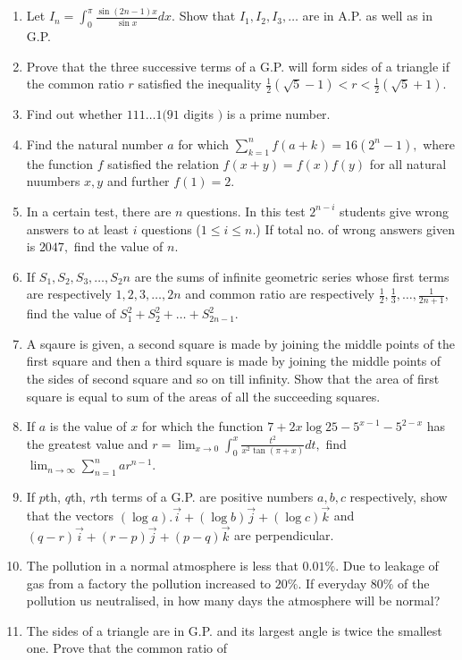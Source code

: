 \begin{enumerate}
\item Let $\displaystyle I_n = \int_0^\pi \frac{\sin(2n - 1)x}{\sin x}dx.$ Show that $I_1, I_2, I_3, \ldots$ are in A.P. as well as in
  G.P.
\item Prove that the three successive terms of a G.P. will form sides of a triangle if the common ratio $r$ satisfied the
  inequality $\frac{1}{2}(\sqrt{5} - 1) < r < \frac{1}{2}(\sqrt{5} + 1)$.
\item Find out whether $111\ldots1( 91$ digits $)$ is a prime number.
\item Find the natural number $a$ for which $\sum_{k = 1}^nf(a + k) = 16(2^n - 1),$ where the function $f$ satisfied the
  relation $f(x + y) = f(x)f(y)$ for all natural nuumbers $x, y$ and further $f(1) = 2$.
\item In a certain test, there are $n$ questions. In this test $2^{n - i}$ students give wrong answers to at least $i$
  questions ($1\leq i \leq n.$) If total no. of wrong answers given is $2047,$ find the value of $n$.
\item If $S_1, S_2, S_3, \ldots, S_2n$ are the sums of infinite geometric series whose first terms are respectively $1, 2,
  3, \ldots, 2n$ and common ratio are respectively $\frac{1}{2}, \frac{1}{3}, \ldots, \frac{1}{2n + 1},$ find the value of $S_1^2 +
  S_2^2 + \ldots + S_{2n - 1}^2$.
\item A sqaure is given, a second square is made by joining the middle points of the first square and then a third square
  is made by joining the middle points of the sides of second square and so on till infinity. Show that the area of first square is
  equal to sum of the areas of all the succeeding squares.
\item If $a$ is the value of $x$ for which the function $7 + 2x\log 25 - 5^{x - 1} - 5^{2 - x}$ has the greatest value and
  $r = \displaystyle\lim_{x\to 0}\int_{0}^x\frac{t^2}{x^2\tan(\pi + x)}dt,$ find $\displaystyle\lim_{n \to \infty}\sum_{n =
  1}^nar^{n - 1}$.
\item If $p$th, $q$th, $r$th terms of a G.P. are positive numbers $a, b, c$ respectively, show that the vectors $(\log
  a).\vec{i} + (\log b)\vec{j} + (\log c)\vec{k}$ and $(q - r)\vec{i} + (r - p)\vec{j} + (p - q)\vec{k}$ are perpendicular.
\item The pollution in a normal atmosphere is less that $0.01\%.$ Due to leakage of gas from a factory the pollution
  increased to $20\%.$ If everyday $80\%$ of the pollution us neutralised, in how many days the atmosphere will be normal?
\item The sides of a triangle are in G.P. and its largest angle is twice the smallest one. Prove that the common ratio of

\end{enumerate}

